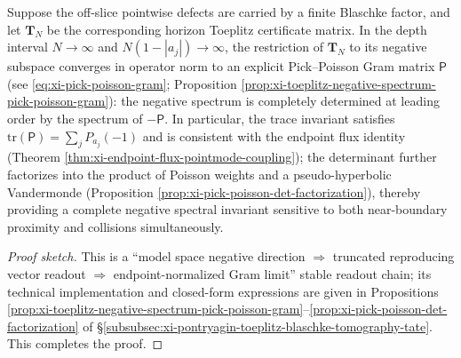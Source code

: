 \begin{proposition}\label{con:discussion-toeplitz-negative-spectrum-semiclassical}
Suppose the off-slice pointwise defects are carried by a finite Blaschke factor, and let \(\mathbf{T}_N\) be the corresponding horizon Toeplitz certificate matrix.
In the depth interval \(N\to\infty\) and \(N(1-|a_j|)\to\infty\), the restriction of \(\mathbf{T}_N\) to its negative subspace converges in operator norm to an explicit Pick--Poisson Gram matrix \(\mathsf P\) (see \eqref{eq:xi-pick-poisson-gram}; Proposition \ref{prop:xi-toeplitz-negative-spectrum-pick-poisson-gram}):
the negative spectrum is completely determined at leading order by the spectrum of \(-\mathsf P\).
In particular, the trace invariant satisfies
\(
\mathrm{tr}(\mathsf P)=\sum_j P_{a_j}(-1)
\)
and is consistent with the endpoint flux identity (Theorem \ref{thm:xi-endpoint-flux-pointmode-coupling});
the determinant further factorizes into the product of Poisson weights and a pseudo-hyperbolic Vandermonde (Proposition \ref{prop:xi-pick-poisson-det-factorization}), thereby providing a complete negative spectral invariant sensitive to both near-boundary proximity and collisions simultaneously.
\end{proposition}
\begin{proof}[Proof sketch]
This is a ``model space negative direction \(\Rightarrow\) truncated reproducing vector readout \(\Rightarrow\) endpoint-normalized Gram limit'' stable readout chain;
its technical implementation and closed-form expressions are given in Propositions \ref{prop:xi-toeplitz-negative-spectrum-pick-poisson-gram}--\ref{prop:xi-pick-poisson-det-factorization} of \S\ref{subsubsec:xi-pontryagin-toeplitz-blaschke-tomography-tate}. This completes the proof.
\end{proof}


